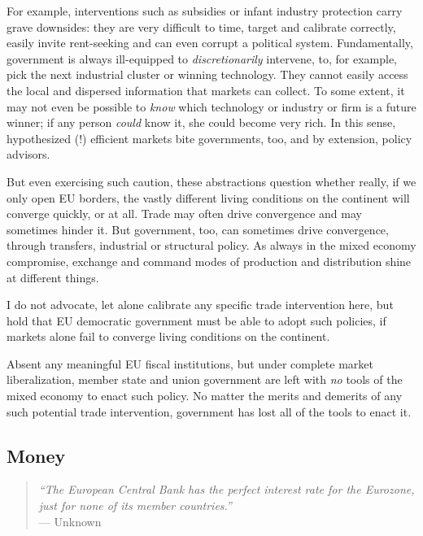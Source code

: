 \documentclass[11pt,a4paper,oneside,openright]{article}
\begin{document}
\begin{enumerate}
	For example, interventions such as subsidies or infant industry protection carry grave downsides: 
	they are very difficult to time, target and calibrate correctly, easily invite rent-seeking and can even corrupt a political system. 
	Fundamentally, government is always ill-equipped to \emph{discretionarily} intervene, to, for example, pick the next industrial cluster or winning technology. 
	They cannot easily access the local and dispersed information that markets can collect. 
	To some extent, it may not even be possible to \emph{know} which technology or industry or firm is a future winner; if any person \emph{could} know it, she could become very rich. 
	In this sense, hypothesized (!) efficient markets bite governments, too, and by extension, policy advisors.

\end{enumerate}

But even exercising such caution, these abstractions question whether really, if we only open \gls{EU} borders, the vastly different living conditions on the continent will converge quickly, or at all. 
Trade may often drive convergence and may sometimes hinder it. 
But government, too, can sometimes drive convergence, through transfers, industrial or structural policy. 
As always in the mixed economy compromise, exchange and command modes of production and distribution shine at different things.

I do not advocate, let alone calibrate any specific trade intervention here, but hold that \gls{EU} democratic government must be able to adopt such policies, if markets alone fail to converge living conditions on the continent.

Absent any meaningful \gls{EU} fiscal institutions, but under complete market liberalization, member state and union government are left with \emph{no} tools of the mixed economy to enact such policy. 
No matter the merits and demerits of any such potential trade intervention, government has lost all of the tools to enact it.

\subsection{Money}

\begin{quote}
	\emph{``The European Central Bank has the perfect interest rate for the Eurozone, just for none of its member countries.''}\\
	--- Unknown
\end{quote}
\end{document}
